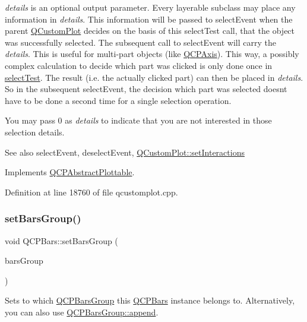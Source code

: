 {\itshape details} is an optional output parameter. Every layerable subclass may place any information in {\itshape details}. This information will be passed to select\+Event when the parent \hyperlink{class_q_custom_plot}{Q\+Custom\+Plot} decides on the basis of this select\+Test call, that the object was successfully selected. The subsequent call to select\+Event will carry the {\itshape details}. This is useful for multi-\/part objects (like \hyperlink{class_q_c_p_axis}{Q\+C\+P\+Axis}). This way, a possibly complex calculation to decide which part was clicked is only done once in \hyperlink{class_q_c_p_bars_a62d66cc8eedca6bedfc1f6513164d418}{select\+Test}. The result (i.\+e. the actually clicked part) can then be placed in {\itshape details}. So in the subsequent select\+Event, the decision which part was selected doesn\textquotesingle{}t have to be done a second time for a single selection operation.

You may pass 0 as {\itshape details} to indicate that you are not interested in those selection details.

\begin{DoxySeeAlso}{See also}
select\+Event, deselect\+Event, \hyperlink{class_q_custom_plot_a5ee1e2f6ae27419deca53e75907c27e5}{Q\+Custom\+Plot\+::set\+Interactions} 
\end{DoxySeeAlso}


Implements \hyperlink{class_q_c_p_abstract_plottable_a38efe9641d972992a3d44204bc80ec1d}{Q\+C\+P\+Abstract\+Plottable}.



Definition at line 18760 of file qcustomplot.\+cpp.

\mbox{\label{class_q_c_p_bars_aedd1709061f0b307c47ddb45e172ef9a}} 
\subsubsection{\texorpdfstring{set\+Bars\+Group()}{setBarsGroup()}}
{\footnotesize\ttfamily void Q\+C\+P\+Bars\+::set\+Bars\+Group (\begin{DoxyParamCaption}\item[{\hyperlink{class_q_c_p_bars_group}{Q\+C\+P\+Bars\+Group} $\ast$}]{bars\+Group }\end{DoxyParamCaption})}

Sets to which \hyperlink{class_q_c_p_bars_group}{Q\+C\+P\+Bars\+Group} this \hyperlink{class_q_c_p_bars}{Q\+C\+P\+Bars} instance belongs to. Alternatively, you can also use \hyperlink{class_q_c_p_bars_group_a809ed63cc4ff7cd5b0b8c96b470163d3}{Q\+C\+P\+Bars\+Group\+::append}.

